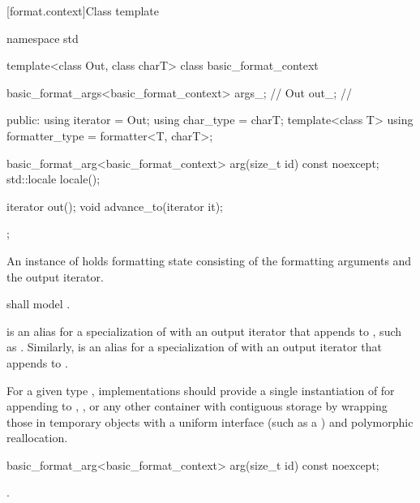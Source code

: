 [format.context]{Class template }

%
%
%
%
\begin{codeblock}
namespace std {
  template<class Out, class charT>
  class basic_format_context {
    basic_format_args<basic_format_context> args_;      // \expos
    Out out_;                                           // \expos

  public:
    using iterator = Out;
    using char_type = charT;
    template<class T> using formatter_type = formatter<T, charT>;

    basic_format_arg<basic_format_context> arg(size_t id) const noexcept;
    std::locale locale();

    iterator out();
    void advance_to(iterator it);
  };
}
\end{codeblock}

\pnum
An instance of  holds formatting state
consisting of the formatting arguments and the output iterator.

\pnum
{} shall model .

\pnum
{}%
 is an alias for
a specialization of 
with an output iterator
that appends to ,
such as .
%
Similarly,  is an alias for
a specialization of 
with an output iterator
that appends to .

\pnum
\recommended
For a given type ,
implementations should provide
a single instantiation of 
for appending to
,
,
or any other container with contiguous storage
by wrapping those in temporary objects with a uniform interface
(such as a ) and polymorphic reallocation.

%
\begin{itemdecl}
basic_format_arg<basic_format_context> arg(size_t id) const noexcept;
\end{itemdecl}

\begin{itemdescr}
\pnum
\returns
{}.
\end{itemdescr}

